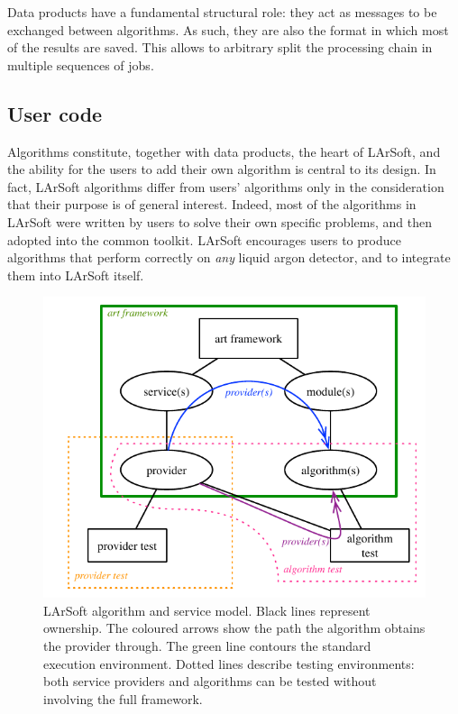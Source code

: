 Data products have a fundamental structural role:
they act as messages to be exchanged between algorithms.
As such, they are also the format in which most of the results are saved.
This allows to arbitrary split the processing chain in multiple sequences of jobs.


\subsection{User code}
\label{ssec:Development:UserCode}

Algorithms constitute, together with data products, the heart of LArSoft,
and the ability for the users to add their own algorithm is central to its design.
In fact, LArSoft algorithms differ from users' algorithms
only in the consideration that their purpose is of general interest.
Indeed, most of the algorithms in LArSoft were written by users to solve their own specific problems,
and then adopted into the common toolkit.
LArSoft encourages users to produce algorithms that perform correctly on \emph{any} liquid argon detector,
and to integrate them into LArSoft itself.

\begin{figure}
   \centering
   \includegraphics{figures/LArSoftFactorizationModelAndTests}
   \caption[LArSoft algorithm and service model]{
      \label{fig:AlgorithmModel}
      LArSoft algorithm and service model.
      Black lines represent ownership.
      The coloured arrows show the path the algorithm obtains the provider through.
      The green line contours the standard execution environment.
      Dotted lines describe testing environments:
      both service providers and algorithms can be tested without involving the full framework.
   }
\end{figure}

